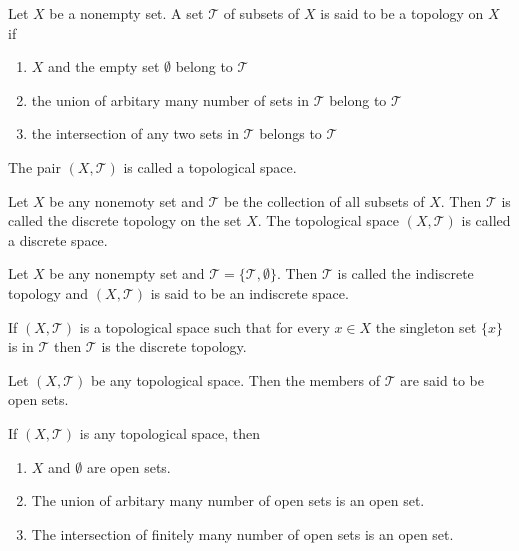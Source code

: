 \begin{defn}
    Let \(X\) be a nonempty set. A set \(\mathcal{T}\) of subsets of \(X\) is said to be a topology on \(X\) if
    \begin{enumerate}
        \item \(X\) and the empty set \(\emptyset\) belong to \(\mathcal{T}\)
        \item the union of arbitary many number of sets in \(\mathcal{T}\) belong to \(\mathcal{T}\)
        \item the intersection of any two sets in \(\mathcal{T}\) belongs to \(\mathcal{T}\)
    \end{enumerate}
    The pair \((X, \mathcal{T})\) is called a topological space.
\end{defn}

\begin{defn}
    Let \(X\) be any nonemoty set and \(\mathcal{T}\) be the collection of all subsets of \(X\). Then \(\mathcal{T}\) is called the discrete topology on the set \(X\). The topological space \((X, \mathcal{T})\) is called a discrete space.
\end{defn}

\begin{defn}
    Let \(X\) be any nonempty set and \(\mathcal{T} = \{\mathcal{T}, \emptyset\}\). Then \(\mathcal{T}\) is called the indiscrete topology and \((X, \mathcal{T})\) is said to be an indiscrete space.
\end{defn}

\begin{prps}
    If \((X, \mathcal{T})\) is a topological space such that for every \(x \in X\) the singleton set \(\{x\}\) is in \(\mathcal{T}\) then \(\mathcal{T}\) is the discrete topology.
\end{prps}

\begin{defn}
    Let \((X, \mathcal{T})\) be any topological space. Then the members of \(\mathcal{T}\) are said to be open sets.
\end{defn}

\begin{prps}
    If \((X, \mathcal{T})\) is any topological space, then
    \begin{enumerate}
        \item \(X\) and \(\emptyset\) are open sets.
        \item The union of arbitary many number of open sets is an open set.
        \item The intersection of finitely many number of open sets is an open set.
    \end{enumerate}
\end{prps}

